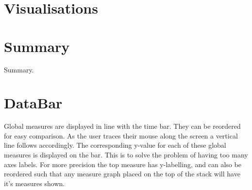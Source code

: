 
\section*{Visualisations}

\section*{Summary}
Summary.

\section{DataBar}
Global measures are displayed in line with the time bar. They can be reordered for easy comparison. As the user traces their mouse along the screen a vertical line follows accordingly. The corresponding y-value for each of these global measures is displayed on the bar. This is to solve the problem of having too many axes labels. For more precision the top measure has y-labelling, and can also be reordered such that any measure graph placed on the top of the stack will have it’s measures shown.



